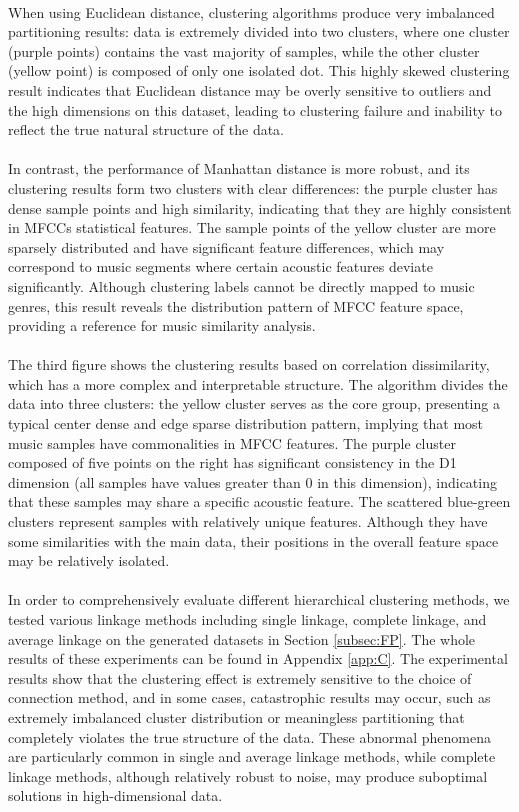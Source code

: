 \\
When using Euclidean distance, clustering algorithms produce very imbalanced partitioning results: data is extremely divided into two clusters, where one cluster (purple points) contains the vast majority of samples, while the other cluster (yellow point) is composed of only one isolated dot. This highly skewed clustering result indicates that Euclidean distance may be overly sensitive to outliers and the high dimensions on this dataset, leading to clustering failure and inability to reflect the true natural structure of the data.\\
\\
In contrast, the performance of Manhattan distance is more robust, and its clustering results form two clusters with clear differences: the purple cluster has dense sample points and high similarity, indicating that they are highly consistent in MFCCs statistical features. The sample points of the yellow cluster are more sparsely distributed and have significant feature differences, which may correspond to music segments where certain acoustic features deviate significantly. Although clustering labels cannot be directly mapped to music genres, this result reveals the distribution pattern of MFCC feature space, providing a reference for music similarity analysis.\\
\\
The third figure shows the clustering results based on correlation dissimilarity, which has a more complex and interpretable structure. The algorithm divides the data into three clusters: the yellow cluster serves as the core group, presenting a typical center dense and edge sparse distribution pattern, implying that most music samples have commonalities in MFCC features. The purple cluster composed of five points on the right has significant consistency in the D1 dimension (all samples have values greater than 0 in this dimension), indicating that these samples may share a specific acoustic feature. The scattered blue-green clusters represent samples with relatively unique features. Although they have some similarities with the main data, their positions in the overall feature space may be relatively isolated.\\
\\
In order to comprehensively evaluate different hierarchical clustering methods, we tested various linkage methods including single linkage, complete linkage, and average linkage on the generated datasets in Section \ref{subsec:FP}. The whole results of these experiments can be found in Appendix \ref{app:C}. The experimental results show that the clustering effect is extremely sensitive to the choice of connection method, and in some cases, catastrophic results  may occur, such as extremely imbalanced cluster distribution or meaningless partitioning that completely violates the true structure of the data. These abnormal phenomena are particularly common in single and average linkage methods, while complete linkage methods, although relatively robust to noise, may produce suboptimal solutions in high-dimensional data.\\
